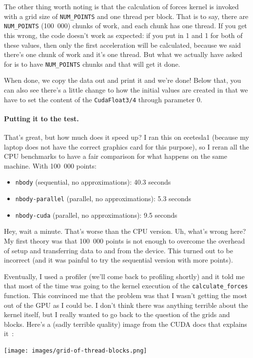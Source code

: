 \documentclass[a4paper]{report}
\begin{document}
The other thing worth noting is that the calculation of forces kernel is invoked with a grid size of \texttt{NUM\_POINTS} and one thread per block. That is to say, there are \texttt{NUM\_POINTS} (100~000) chunks of work, and each chunk has one thread. If you get this wrong, the code doesn't work as expected: if you put in 1 and 1 for both of these values, then only the first acceleration will be calculated, because we said there's one chunk of work and it's one thread. But what we actually have asked for is to have \texttt{NUM\_POINTS} chunks and that will get it done.

When done, we copy the data out and print it and we're done! Below that, you can also see there's a little change to how the initial values are created in that we have to set the content of the \texttt{CudaFloat3/4} through parameter 0. 

\paragraph{Putting it to the test.}
That's great, but how much does it speed up? I ran this on ecetesla1 (because my laptop does not have the correct graphics card for this purpose), so I reran all the CPU benchmarks to have a fair comparison for what happens on the same machine. With 100~000 points:
\begin{itemize}
	\item \texttt{nbody} (sequential, no approximations): 40.3 seconds\vspace{-1em}
	\item \texttt{nbody-parallel} (parallel, no approximations): 5.3 seconds\vspace{-1em}
	\item \texttt{nbody-cuda} (parallel, no approximations): 9.5 seconds
\end{itemize}

Hey, wait a minute. That's worse than the CPU version. Uh, what's wrong here? My first theory was that 100~000 points is not enough to overcome the overhead of setup and transferring data to and from the device. This turned out to be incorrect (and it was painful to try the sequential version with more points). 

Eventually, I used a profiler (we'll come back to profiling shortly) and it told me that most of the time was going to the kernel execution of the \texttt{calculate\_forces} function. This convinced me that the problem was that I wasn't getting the most out of the GPU as I could be. I don't think there was anything terrible about the kernel itself, but I really wanted to go back to the question of the grids and blocks. Here's a (sadly terrible quality) image from the CUDA docs that explains it~\cite{cuda}:
\begin{center}
	\texttt{[image: images/grid-of-thread-blocks.png]}
\end{center}
\end{document}
